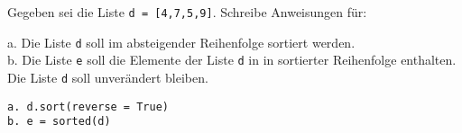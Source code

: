 \question[2]

Gegeben sei die Liste \texttt{d = [4,7,5,9]}. Schreibe Anweisungen für:

a. Die Liste \texttt{d} soll im absteigender Reihenfolge sortiert werden. \\
b. Die Liste \texttt{e} soll die Elemente der Liste \texttt{d} in in sortierter Reihenfolge
enthalten. Die Liste \texttt{d} soll unverändert bleiben.

\begin{solutionbox}{3cm}
\begin{lstlisting}
a. d.sort(reverse = True)
b. e = sorted(d)
\end{lstlisting}
\end{solutionbox}

